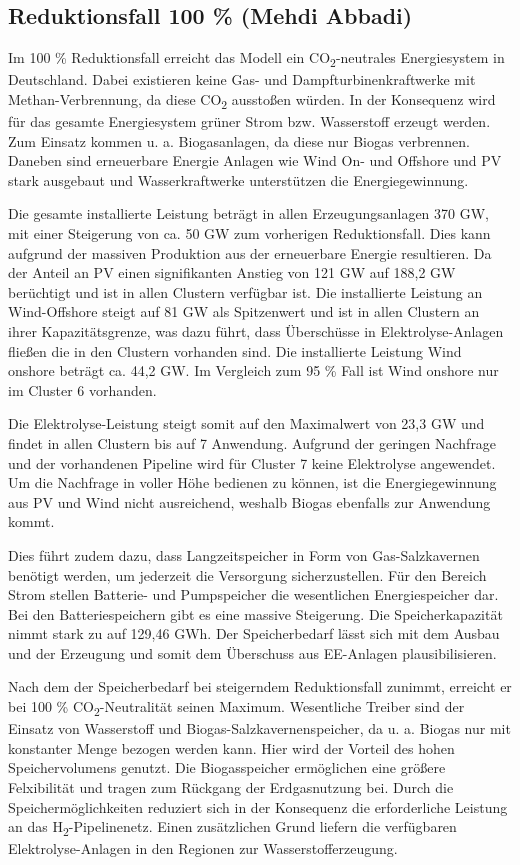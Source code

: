 \newpage
\subsection{Reduktionsfall 100 \% (Mehdi Abbadi)}
Im 100 \% Reduktionsfall erreicht das Modell ein CO\textsubscript{2}-neutrales Energiesystem in Deutschland. Dabei existieren keine Gas- und Dampfturbinenkraftwerke mit Methan-Verbrennung, da diese CO\textsubscript{2} ausstoßen würden. In der Konsequenz wird für das gesamte Energiesystem grüner Strom bzw. Wasserstoff erzeugt werden. Zum Einsatz kommen u. a. Biogasanlagen, da diese nur Biogas verbrennen. Daneben sind erneuerbare Energie Anlagen wie Wind On- und Offshore und PV stark ausgebaut und Wasserkraftwerke unterstützen die Energiegewinnung. 

Die gesamte installierte Leistung beträgt in allen Erzeugungsanlagen 370 GW, mit einer Steigerung von ca. 50 GW zum vorherigen Reduktionsfall. Dies kann aufgrund der massiven Produktion aus der erneuerbare Energie resultieren. Da der Anteil an PV einen signifikanten Anstieg von 121 GW auf 188,2 GW berüchtigt und ist in allen Clustern verfügbar ist. Die installierte Leistung an Wind-Offshore steigt auf 81 GW als Spitzenwert und ist in allen Clustern an ihrer Kapazitätsgrenze, was dazu führt, dass Überschüsse in Elektrolyse-Anlagen fließen die in den Clustern vorhanden sind.  Die installierte Leistung Wind onshore beträgt ca. 44,2 GW. Im Vergleich zum 95 \% Fall ist Wind onshore nur im Cluster 6 vorhanden. 

Die Elektrolyse-Leistung steigt somit auf den Maximalwert von 23,3 GW und findet in allen Clustern bis auf 7 Anwendung. Aufgrund der geringen Nachfrage und der vorhandenen Pipeline wird für Cluster 7 keine Elektrolyse angewendet. Um die Nachfrage in voller Höhe bedienen zu können, ist die Energiegewinnung aus PV und Wind nicht ausreichend, weshalb Biogas ebenfalls zur Anwendung kommt. 

Dies führt zudem dazu, dass Langzeitspeicher in Form von Gas-Salzkavernen benötigt werden, um jederzeit die Versorgung sicherzustellen. Für den Bereich Strom stellen Batterie- und Pumpspeicher die wesentlichen Energiespeicher dar. Bei den Batteriespeichern gibt es eine massive Steigerung. Die Speicherkapazität nimmt stark zu auf 129,46 GWh. Der Speicherbedarf lässt sich mit dem Ausbau und der Erzeugung und somit dem Überschuss aus EE-Anlagen plausibilisieren.  

Nach dem der Speicherbedarf bei steigerndem Reduktionsfall zunimmt, erreicht er bei 100 \% CO\textsubscript{2}-Neutralität seinen Maximum. Wesentliche Treiber sind der Einsatz von Wasserstoff und Biogas-Salzkavernenspeicher, da u. a. Biogas nur mit konstanter Menge bezogen werden kann. Hier wird der Vorteil des hohen Speichervolumens genutzt. Die Biogasspeicher ermöglichen eine größere Felxibilität und tragen zum Rückgang der Erdgasnutzung bei. Durch die Speichermöglichkeiten reduziert sich in der Konsequenz die erforderliche Leistung an das H\textsubscript{2}-Pipelinenetz. Einen zusätzlichen Grund liefern die verfügbaren Elektrolyse-Anlagen in den Regionen zur Wasserstofferzeugung.

